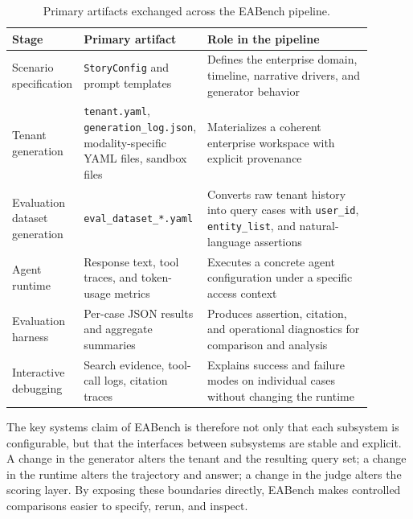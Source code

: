 \begin{table}[h]
\centering
\caption{Primary artifacts exchanged across the EABench pipeline.}
\label{tab:pipeline_artifacts}
\small
\begin{tabular}{p{0.17\linewidth}p{0.24\linewidth}p{0.48\linewidth}}
\toprule
\textbf{Stage} & \textbf{Primary artifact} & \textbf{Role in the pipeline} \\
\midrule
Scenario specification & \texttt{StoryConfig} and prompt templates & Defines the enterprise domain, timeline, narrative drivers, and generator behavior \\
Tenant generation & \texttt{tenant.yaml}, \texttt{generation\_log.json}, modality-specific YAML files, sandbox files & Materializes a coherent enterprise workspace with explicit provenance \\
Evaluation dataset generation & \texttt{eval\_dataset\_*.yaml} & Converts raw tenant history into query cases with \texttt{user\_id}, \texttt{entity\_list}, and natural-language assertions \\
Agent runtime & Response text, tool traces, and token-usage metrics & Executes a concrete agent configuration under a specific access context \\
Evaluation harness & Per-case JSON results and aggregate summaries & Produces assertion, citation, and operational diagnostics for comparison and analysis \\
Interactive debugging & Search evidence, tool-call logs, citation traces & Explains success and failure modes on individual cases without changing the runtime \\
\bottomrule
\end{tabular}

\end{table}

The key systems claim of EABench is therefore not only that each subsystem is configurable, but that the interfaces between subsystems are stable and explicit. A change in the generator alters the tenant and the resulting query set; a change in the runtime alters the trajectory and answer; a change in the judge alters the scoring layer. By exposing these boundaries directly, EABench makes controlled comparisons easier to specify, rerun, and inspect.